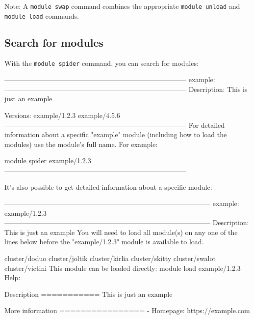 Note: A \lstinline|module swap| command combines the appropriate \lstinline|module unload|
and \lstinline|module load| commands.

\ifusinglmod
\subsection{Search for modules}

With the \lstinline|module spider| command, you can search for modules:

\begin{prompt}
--------------------------------------------------------------------------------
  example:
--------------------------------------------------------------------------------
    Description:
      This is just an example

     Versions:
        example/1.2.3
        example/4.5.6
--------------------------------------------------------------------------------
  For detailed information about a specific "example" module (including how to
  load the modules) use the module's full name.
  For example:

     module spider example/1.2.3
--------------------------------------------------------------------------------
\end{prompt}

It's also possible to get detailed information about a specific module:

\begin{prompt}
------------------------------------------------------------------------------------------
  example: example/1.2.3
------------------------------------------------------------------------------------------
    Description:
      This is just an example
    You will need to load all module(s) on any one of the lines below before the "example/1.2.3" module is available to load.

      cluster/doduo
      cluster/joltik
      cluster/kirlia
      cluster/skitty
      cluster/swalot
      cluster/victini
    This module can be loaded directly: module load example/1.2.3
    Help:

      Description
      ===========
      This is just an example


      More information
      ================
       - Homepage: https://example.com

\end{prompt}

